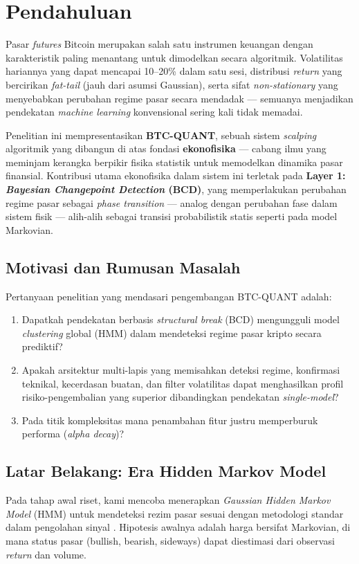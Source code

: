 \section{Pendahuluan}
\label{sec:intro}

Pasar \textit{futures} Bitcoin merupakan salah satu instrumen keuangan dengan karakteristik paling menantang untuk dimodelkan secara algoritmik. Volatilitas hariannya yang dapat mencapai 10--20\% dalam satu sesi, distribusi \textit{return} yang bercirikan \textit{fat-tail} (jauh dari asumsi Gaussian), serta sifat \textit{non-stationary} yang menyebabkan perubahan regime pasar secara mendadak --- semuanya menjadikan pendekatan \textit{machine learning} konvensional sering kali tidak memadai.

Penelitian ini mempresentasikan \textbf{BTC-QUANT}, sebuah sistem \textit{scalping} algoritmik yang dibangun di atas fondasi \textbf{ekonofisika} --- cabang ilmu yang meminjam kerangka berpikir fisika statistik untuk memodelkan dinamika pasar finansial. Kontribusi utama ekonofisika dalam sistem ini terletak pada \textbf{Layer 1: \textit{Bayesian Changepoint Detection} (BCD)}, yang memperlakukan perubahan regime pasar sebagai \textit{phase transition} --- analog dengan perubahan fase dalam sistem fisik --- alih-alih sebagai transisi probabilistik statis seperti pada model Markovian.

\subsection{Motivasi dan Rumusan Masalah}

Pertanyaan penelitian yang mendasari pengembangan BTC-QUANT adalah:
\begin{enumerate}
    \item Dapatkah pendekatan berbasis \textit{structural break} (BCD) mengungguli model \textit{clustering} global (HMM) dalam mendeteksi regime pasar kripto secara prediktif?
    \item Apakah arsitektur multi-lapis yang memisahkan deteksi regime, konfirmasi teknikal, kecerdasan buatan, dan filter volatilitas dapat menghasilkan profil risiko-pengembalian yang superior dibandingkan pendekatan \textit{single-model}?
    \item Pada titik kompleksitas mana penambahan fitur justru memperburuk performa (\textit{alpha decay})?
\end{enumerate}

\subsection{Latar Belakang: Era Hidden Markov Model}
Pada tahap awal riset, kami mencoba menerapkan \textit{Gaussian Hidden Markov Model} (HMM) untuk mendeteksi rezim pasar sesuai dengan metodologi standar dalam pengolahan sinyal \cite{rabiner1989tutorial}. Hipotesis awalnya adalah harga bersifat Markovian, di mana status pasar (bullish, bearish, sideways) dapat diestimasi dari observasi \textit{return} dan volume.


